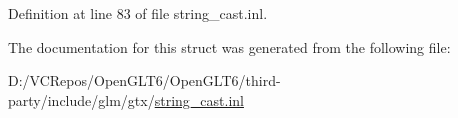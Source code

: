 Definition at line 83 of file string\+\_\+cast.\+inl.



The documentation for this struct was generated from the following file\+:\begin{DoxyCompactItemize}
\item 
D\+:/\+V\+C\+Repos/\+Open\+G\+L\+T6/\+Open\+G\+L\+T6/third-\/party/include/glm/gtx/\mbox{\hyperlink{string__cast_8inl}{string\+\_\+cast.\+inl}}\end{DoxyCompactItemize}

